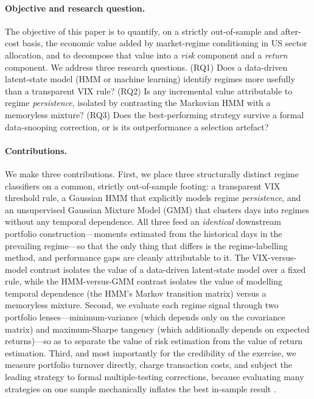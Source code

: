 \documentclass[12pt,a4paper]{article}
\begin{document}
\paragraph{Objective and research question.}
The objective of this paper is to quantify, on a strictly out-of-sample and after-cost
basis, the economic value added by market-regime conditioning in US sector allocation,
and to decompose that value into a \emph{risk} component and a \emph{return} component.
We address three research questions. (RQ1) Does a data-driven latent-state model (HMM or
machine learning) identify regimes more usefully than a transparent VIX rule? (RQ2) Is
any incremental value attributable to regime \emph{persistence}, isolated by contrasting
the Markovian HMM with a memoryless mixture? (RQ3) Does the best-performing strategy
survive a formal data-snooping correction, or is its outperformance a selection artefact?

\paragraph{Contributions.}
We make three contributions. First, we place three structurally distinct regime
classifiers on a common, strictly out-of-sample footing: a transparent VIX threshold
rule, a Gaussian HMM that explicitly models regime \emph{persistence}, and an unsupervised
Gaussian Mixture Model (GMM) that clusters days into regimes without any temporal
dependence. All three feed an \emph{identical} downstream portfolio construction---moments
estimated from the historical days in the prevailing regime---so that the only thing that
differs is the regime-labelling method, and performance gaps are cleanly attributable to
it. The VIX-versus-model contrast isolates the value of a data-driven latent-state model
over a fixed rule, while the HMM-versus-GMM contrast isolates the value of modelling
temporal dependence (the HMM's Markov transition matrix) versus a memoryless mixture.
Second, we evaluate each regime signal through two portfolio lenses---minimum-variance
(which depends only on the covariance matrix) and maximum-Sharpe tangency (which
additionally depends on expected returns)---so as to separate the value of risk estimation
from the value of return estimation. Third, and most importantly for the credibility of the
exercise, we measure portfolio turnover directly, charge transaction costs, and subject
the leading strategy to formal multiple-testing corrections, because evaluating many
strategies on one sample mechanically inflates the best in-sample result
\citep{harvey2016}.
\end{document}
